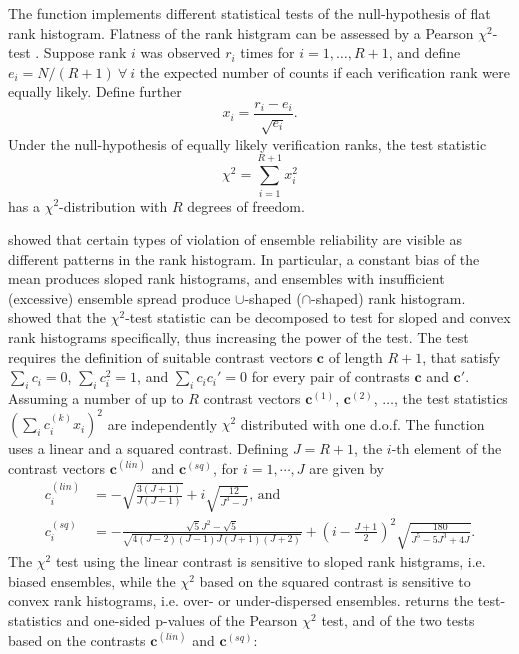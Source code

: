\documentclass[article]{jss}\usepackage{graphicx, color}
\begin{document}
The function  implements different statistical tests of the null-hypothesis of flat rank histogram.
Flatness of the rank histgram can be assessed by a Pearson $\chi^2$-test \citep{pearson1900criterion}.
Suppose rank $i$ was observed $r_i$ times for $i=1,\dots,R+1$, and define $e_i=N/(R+1)\ \forall\ i$ the expected number of counts if each verification rank were equally likely.
Define further
\begin{equation}
x_i = \frac{r_i - e_i}{\sqrt{e_i}}.
\end{equation}
%
Under the null-hypothesis of equally likely verification ranks, the test statistic
%
\begin{equation}
\chi^2 = \sum_{i=1}^{R+1} x_i^2
\end{equation}
%
has a $\chi^2$-distribution with $R$ degrees of freedom.


\citet{hamill2001interpretation} showed that certain types of violation of ensemble reliability are visible as different patterns in the rank histogram.
In particular, a constant bias of the mean produces sloped rank histograms, and ensembles with insufficient (excessive) ensemble spread produce $\cup$-shaped ($\cap$-shaped) rank histogram.
\citet{jolliffe2008evaluating} showed that the $\chi^2$-test statistic can be decomposed to test for sloped and convex rank histograms specifically, thus increasing the power of the test.
The test requires the definition of suitable contrast vectors $\mathbf{c}$ of length $R+1$, that satisfy $\sum_i c_i = 0$, $\sum_i c_i^2 = 1$, and $\sum_i c_i c_i' = 0$ for every pair of contrasts $\mathbf{c}$ and $\mathbf{c}'$.
Assuming a number of up to $R$ contrast vectors $\mathbf{c}^{(1)}$, $\mathbf{c}^{(2)}$, $\dots$, the test statistics $(\sum_i c^{(k)}_i x_i)^2$ are independently $\chi^2$ distributed with one d.o.f. 
The function  uses a linear and a squared contrast. Defining $J=R+1$, the $i$-th element of the contrast vectors $\mathbf{c}^{(lin)}$ and $\mathbf{c}^{(sq)}$, for $i=1,\cdots,J$ are given by
%
\begin{align}
c^{(lin)}_i & = -\sqrt{\frac{3(J+1)}{J (J-1)}} + i \sqrt{\frac{12}{J^3 - J}}\text{, and}\\
c^{(sq)}_i & =  - \frac{\sqrt{5}  J^2 - \sqrt{5}}{\sqrt{4(J - 2)  (J-1) J (J+1) (J+2)}}+ \left(i - \frac{J+1}{2}\right)^2   \sqrt{\frac{180}{ J^5 - 5 J^3 + 4 J}}.
\end{align}
%
The $\chi^2$ test using the linear contrast is sensitive to sloped rank histgrams, i.e. biased ensembles, while the $\chi^2$ based on the squared contrast is sensitive to convex rank histograms, i.e. over- or under-dispersed ensembles.
 returns the test-statistics and one-sided p-values of the Pearson $\chi^2$ test, and of the two tests based on the contrasts $\mathbf{c}^{(lin)}$ and $\mathbf{c}^{(sq)}$:
\end{document}
